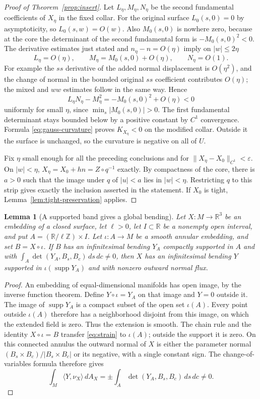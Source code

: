 \documentclass[11pt]{amsart}
\newtheorem{lemma}[theorem]{Lemma}
\theoremstyle{definition}
\newcommand{\R}{\mathbb R}
\DeclareMathOperator{\supp}{supp}
\begin{document}
\begin{proof}[Proof of Theorem~\ref{prop:insert}]
Let $L_\eta,M_\eta,N_\eta$ be the second fundamental coefficients
of $X_\eta$ in the fixed collar. For the original surface
$L_0(s,0)=0$ by asymptoticity, so $L_0(s,w)=O(w)$.
Also $M_0(s,0)$ is nowhere zero, because at the core the
determinant of the second fundamental form is
$-M_0(s,0)^2<0$. The derivative estimates just stated and
$n_\eta-n=O(\eta)$ imply on $|w|\le2\eta$
\[
 L_\eta=O(\eta),\qquad
 M_\eta=M_0(s,0)+O(\eta),\qquad N_\eta=O(1).
\]
For example the $ss$ derivative of the added normal displacement
is $O(\eta^2)$, and the change of normal in the bounded original
$ss$ coefficient contributes $O(\eta)$; the mixed and $ww$
estimates follow in the same way. Hence
\[
 L_\eta N_\eta-M_\eta^2
     =-M_0(s,0)^2+O(\eta)<0
\]
uniformly for small $\eta$, since $\min_s|M_0(s,0)|>0$.
The first fundamental determinant stays bounded below by a
positive constant by $C^1$ convergence. Formula
\eqref{eq:gauss-curvature} proves $K_{X_\eta}<0$ on the
modified collar. Outside it the surface is unchanged, so the
curvature is negative on all of $U$.

Fix $\eta$ small enough for all the preceding conclusions and for
$\|X_\eta-X_0\|_{C^1}<\varepsilon$.
On $|w|<\eta$, $X_\eta=X_0+hn=Z\circ q^{-1}$ exactly.
By compactness of the core, there is $a>0$ such that the image
under $q$ of $|u|<a$ lies in $|w|<\eta$. Restricting $q$ to
this strip gives exactly the inclusion asserted in the statement.
If $X_0$ is tight, Lemma~\ref{lem:tight-preservation} applies.
\end{proof}

\begin{lemma}[A supported band gives a global bending]
\label{lem:globalize}
Let $X:M\to\R^3$ be an embedding of a closed surface, let
$\ell>0$, let $I\subset\R$ be a nonempty open interval, and put
$A=(\R/\ell\mathbb Z)\times I$. Let $\iota:A\to M$ be a smooth
annular embedding, and set $B=X\circ\iota$.
If $B$ has an infinitesimal bending $Y_A$ compactly supported in $A$
and with $\int_A\det(Y_A,B_s,B_c)\,ds\,dc\ne0$, then $X$ has an
infinitesimal bending $Y$ supported in $\iota(\supp Y_A)$ and
with nonzero outward normal flux.
\end{lemma}
\begin{proof}
An embedding of equal-dimensional manifolds has open image, by
the inverse function theorem. Define $Y\circ\iota=Y_A$ on that
image and $Y=0$ outside it.
The image of $\supp Y_A$ is a compact subset of the open set
$\iota(A)$. Every point outside $\iota(A)$ therefore has a
neighborhood disjoint from this image, on which the extended
field is zero. Thus the extension is smooth.
The chain rule and the identity $X\circ\iota=B$ transfer
\eqref{eq:strain} to $\iota(A)$; outside the support it is zero.
On this connected annulus the outward normal of $X$ is either
the parameter normal $(B_s\times B_c)/|B_s\times B_c|$
or its negative, with a single constant sign. The
change-of-variables formula therefore gives
\[
 \int_M\langle Y,\nu_X\rangle\,dA_X
      =\pm\int_A\det(Y_A,B_s,B_c)\,ds\,dc\ne0.
\]
\end{proof}
\end{document}

